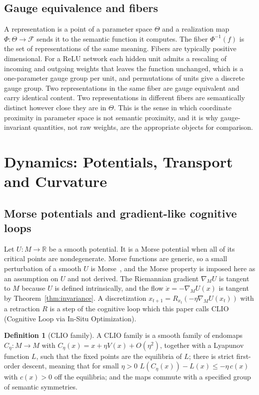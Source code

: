 \documentclass[11pt,a4paper]{article}
\theoremstyle{definition}
\newtheorem{definition}[theorem]{Definition}
\theoremstyle{remark}
\newcommand{\R}{\mathbb{R}}
\begin{document}
\subsection{Gauge equivalence and fibers}

A representation is a point of a parameter space $\Theta$ and a realization
map $\Phi:\Theta\to\mathcal{F}$ sends it to the semantic function it
computes. The fiber $\Phi^{-1}(f)$ is the set of representations of the same
meaning. Fibers are typically positive dimensional. For a ReLU network each
hidden unit admits a rescaling of incoming and outgoing weights that leaves
the function unchanged, which is a one-parameter gauge group per unit, and
permutations of units give a discrete gauge group. Two representations in the
same fiber are gauge equivalent and carry identical content. Two
representations in different fibers are semantically distinct however close
they are in $\Theta$. This is the sense in which coordinate proximity in
parameter space is not semantic proximity, and it is why gauge-invariant
quantities, not raw weights, are the appropriate objects for comparison.

\section{Dynamics: Potentials, Transport and Curvature}\label{sec:dynamics}

\subsection{Morse potentials and gradient-like cognitive loops}

Let $U:M\to\R$ be a smooth potential. It is a Morse potential when all of its
critical points are nondegenerate. Morse functions are generic, so a small
perturbation of a smooth $U$ is Morse~\cite{milnor1963morse}, and the Morse
property is imposed here as an assumption on $U$ and not derived. The
Riemannian gradient $\nabla_MU$ is tangent to $M$ because $U$ is defined
intrinsically, and the flow $\dot x=-\nabla_MU(x)$ is tangent by
Theorem~\ref{thm:invariance}. A discretization
$x_{t+1}=R_{x_t}(-\eta\nabla_MU(x_t))$ with a retraction $R$ is a step of the
cognitive loop which this paper calls CLIO (Cognitive Loop via In-Situ
Optimization).

\begin{definition}[CLIO family]
A CLIO family is a smooth family of endomaps $C_\eta:M\to M$ with
$C_\eta(x)=x+\eta V(x)+O(\eta^2)$, together with a Lyapunov function $L$, such
that the fixed points are the equilibria of $L$; there is strict first-order
descent, meaning that for small $\eta>0$
$L(C_\eta(x))-L(x)\le-\eta\,c(x)$ with $c(x)>0$ off the equilibria; and the
maps commute with a specified group of semantic symmetries.
\end{definition}
\end{document}
